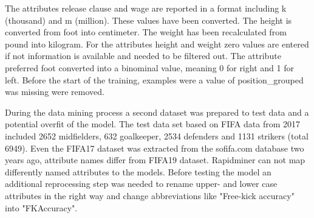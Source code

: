 The attributes release clause and wage are reported in a format including k (thousand) and m (million). These values have been converted. The height is converted from foot into centimeter. The weight has been recalculated from pound into kilogram.  For the attributes height and weight zero values are entered if not information is available and needed to be filtered out. The attribute preferred foot converted into a binominal value, meaning 0 for right and 1 for left. %
Before the start of the training, examples were a value of position\_grouped was missing were removed.

During the data mining process a second dataset was prepared to test data and a potential overfit of the model. The test data set based on FIFA data from 2017 included 2652 midfielders, 632 goalkeeper, 2534 defenders and 1131 strikers (total 6949).
Even the FIFA17 dataset was extracted from the sofifa.com database two years ago, attribute names differ from FIFA19 dataset. Rapidminer can not map differently named attributes to the models. Before testing the model an additional reprocessing step was needed to rename upper- and lower case attributes in the right way and change abbreviations like "Free-kick accuracy" into "FKAccuracy".